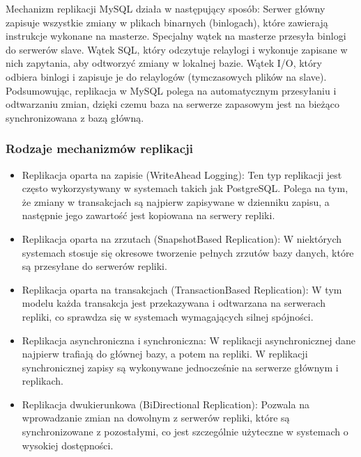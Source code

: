 \documentclass[a4paper,11pt,openany,english]{sphinxmanual}
\begin{document}
\sphinxAtStartPar
Mechanizm replikacji MySQL działa w następujący sposób:
\sphinxhyphen{} Serwer główny zapisuje wszystkie zmiany w plikach binarnych (bin\sphinxhyphen{}logach), które zawierają instrukcje wykonane na masterze.
\sphinxhyphen{} Specjalny wątek na masterze przesyła bin\sphinxhyphen{}logi do serwerów slave.
\sphinxhyphen{} Wątek SQL, który odczytuje relay\sphinxhyphen{}logi i wykonuje zapisane w nich zapytania, aby odtworzyć zmiany w lokalnej bazie.
\sphinxhyphen{} Wątek I/O, który odbiera bin\sphinxhyphen{}logi i zapisuje je do relay\sphinxhyphen{}logów (tymczasowych plików na slave).
Podsumowując, replikacja w MySQL polega na automatycznym przesyłaniu i odtwarzaniu zmian, dzięki czemu baza na serwerze zapasowym jest na bieżąco synchronizowana z bazą główną.


\subsubsection{Rodzaje mechanizmów replikacji}
\label{\detokenize{rozdzial2/Wydajnosc-Skalowanie-i-Replikacja/index:rodzaje-mechanizmow-replikacji}}\begin{itemize}
\item {} 
\sphinxAtStartPar
Replikacja oparta na zapisie (Write\sphinxhyphen{}Ahead Logging): Ten typ replikacji jest często wykorzystywany w systemach takich jak PostgreSQL. Polega na tym, że zmiany w transakcjach są najpierw zapisywane w dzienniku zapisu, a następnie jego zawartość jest kopiowana na serwery repliki.

\item {} 
\sphinxAtStartPar
Replikacja oparta na zrzutach (Snapshot\sphinxhyphen{}Based Replication): W niektórych systemach stosuje się okresowe tworzenie pełnych zrzutów bazy danych, które są przesyłane do serwerów repliki.

\item {} 
\sphinxAtStartPar
Replikacja oparta na transakcjach (Transaction\sphinxhyphen{}Based Replication): W tym modelu każda transakcja jest przekazywana i odtwarzana na serwerach repliki, co sprawdza się w systemach wymagających silnej spójności.

\item {} 
\sphinxAtStartPar
Replikacja asynchroniczna i synchroniczna: W replikacji asynchronicznej dane najpierw trafiają do głównej bazy, a potem na repliki. W replikacji synchronicznej zapisy są wykonywane jednocześnie na serwerze głównym i replikach.

\item {} 
\sphinxAtStartPar
Replikacja dwukierunkowa (Bi\sphinxhyphen{}Directional Replication): Pozwala na wprowadzanie zmian na dowolnym z serwerów repliki, które są synchronizowane z pozostałymi, co jest szczególnie użyteczne w systemach o wysokiej dostępności.

\end{itemize}
\end{document}
